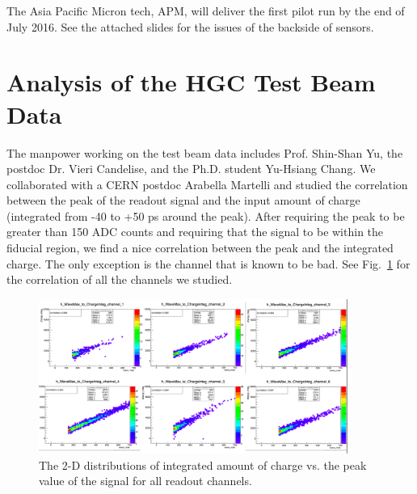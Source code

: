 The Asia Pacific Micron tech, APM, will deliver the first pilot run by
the end of July 2016. See the attached slides for the issues of the backside 
of sensors.

\section{Analysis of the HGC Test Beam Data}
The manpower working on the test beam data includes Prof. Shin-Shan Yu, the postdoc Dr. Vieri Candelise, and the 
Ph.D. student Yu-Hsiang Chang. We collaborated with a CERN postdoc Arabella Martelli and studied the correlation 
between the peak of the readout signal and the input amount of charge (integrated from -40 to +50 ps around the 
peak). After requiring the peak to be greater than 150 ADC counts and requiring that the signal to be within the 
fiducial region, we find a nice correlation between the peak and the integrated charge. The only exception is 
the channel that is known to be bad.
See Fig.~\ref{fig:testbeam_analysis} for the correlation of all the channels we studied.

\begin{figure}[htbp]
   \centering
   \includegraphics[width=0.9\textwidth]{figures/testbeam_analysis.png}
   \caption{The 2-D distributions of integrated amount of charge vs. the peak value of the signal for all readout channels.}
   \label{fig:testbeam_analysis}
\end{figure}






